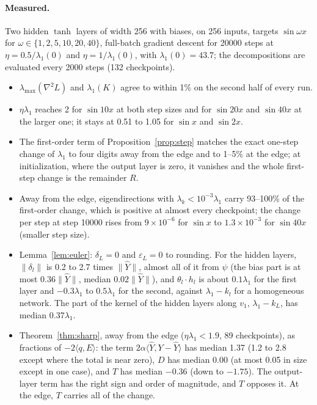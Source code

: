 \documentclass[11pt]{article}
\theoremstyle{definition}
\theoremstyle{remark}
\newcommand{\ip}[2]{\langle #1,#2\rangle}
\begin{document}
\paragraph{Measured.}
Two hidden $\tanh$ layers of width 256 with biases, on 256 inputs, targets $\sin\omega x$ for $\omega\in\{1,2,5,10,20,40\}$, full-batch gradient descent for 20000 steps at $\eta = 0.5/\lambda_1(0)$ and $\eta = 1/\lambda_1(0)$, with $\lambda_1(0) = 43.7$; the decompositions are evaluated every 2000 steps (132 checkpoints).
\begin{itemize}
\item $\lambda_{\max}(\nabla^2L)$ and $\lambda_1(K)$ agree to within 1\% on the second half of every run.
\item $\eta\lambda_1$ reaches 2 for $\sin10x$ at both step sizes and for $\sin20x$ and $\sin40x$ at the larger one; it stays at 0.51 to 1.05 for $\sin x$ and $\sin2x$.
\item The first-order term of Proposition~\ref{prop:step} matches the exact one-step change of $\lambda_1$ to four digits away from the edge and to 1--5\% at the edge; at initialization, where the output layer is zero, it vanishes and the whole first-step change is the remainder $R$.
\item Away from the edge, eigendirections with $\lambda_k < 10^{-3}\lambda_1$ carry 93--100\% of the first-order change, which is positive at almost every checkpoint; the change per step at step 10000 rises from $9\times10^{-6}$ for $\sin x$ to $1.3\times10^{-3}$ for $\sin40x$ (smaller step size).
\item Lemma~\ref{lem:euler}: $\delta_L = 0$ and $\varepsilon_L = 0$ to rounding. For the hidden layers, $\|\delta_l\|$ is 0.2 to 2.7 times $\|\hat Y\|$, almost all of it from $\psi$ (the bias part is at most $0.36\|\hat Y\|$, median $0.02\|\hat Y\|$), and $\theta_l\cdot h_l$ is about $0.1\lambda_1$ for the first layer and $-0.3\lambda_1$ to $0.5\lambda_1$ for the second, against $\lambda_1 - k_l$ for a homogeneous network. The part of the kernel of the hidden layers along $v_1$, $\lambda_1 - k_L$, has median $0.37\lambda_1$.
\item Theorem~\ref{thm:sharp}, away from the edge ($\eta\lambda_1 < 1.9$, 89 checkpoints), as fractions of $-2\ip{q}{E}$: the term $2\alpha\ip{\hat Y}{Y - \hat Y}$ has median 1.37 (1.2 to 2.8 except where the total is near zero), $D$ has median 0.00 (at most 0.05 in size except in one case), and $T$ has median $-0.36$ (down to $-1.75$). The output-layer term has the right sign and order of magnitude, and $T$ opposes it. At the edge, $T$ carries all of the change.

\end{itemize}
\end{document}
